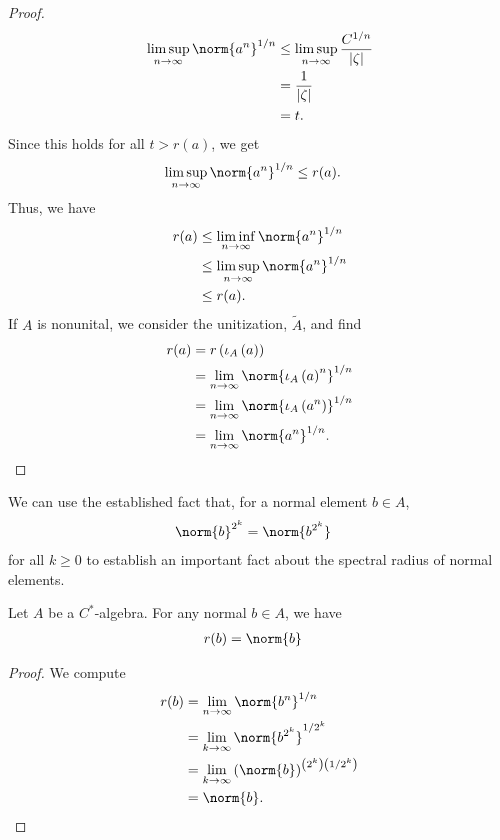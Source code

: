 \documentclass[10pt]{mypackage}
\begin{document}
\begin{proof}
\begin{align*}
    \limsup_{n\rightarrow\infty}\norm{a^n}^{1/n} &\leq \limsup_{n\rightarrow\infty}\frac{C^{1/n}}{\left\vert \zeta \right\vert}\\
                                                 &= \frac{1}{\left\vert \zeta \right\vert}\\
                                                 &= t.
  \end{align*}
  Since this holds for all $t > r(a)$, we get
  \begin{align*}
    \limsup_{n\rightarrow\infty}\norm{a^n}^{1/n} &\leq r(a).
  \end{align*}
  Thus, we have
  \begin{align*}
    r(a) &\leq \liminf_{n\rightarrow\infty}\norm{a^n}^{1/n}\\
         &\leq \limsup_{n\rightarrow\infty}\norm{a^n}^{1/n}\\
         &\leq r(a).
  \end{align*}
  If $A$ is nonunital, we consider the unitization, $\widetilde{A}$, and find
  \begin{align*}
    r(a) &= r\left(\iota_A\left(a\right)\right)\\
         &= \lim_{n\rightarrow\infty}\norm{\iota_A\left(a\right)^{n}}^{1/n}\\
         &= \lim_{n\rightarrow\infty}\norm{\iota_A\left(a^n\right)}^{1/n}\\
         &= \lim_{n\rightarrow\infty}\norm{a^n}^{1/n}.
  \end{align*}
\end{proof}
We can use the established fact that, for a normal element $b\in A$,
\begin{align*}
  \norm{b}^{2^k} &= \norm{b^{2^k}}
\end{align*}
for all $k\geq 0$ to establish an important fact about the spectral radius of normal elements.
\begin{proposition}
  Let $A$ be a $C^{\ast}$-algebra. For any normal $b\in A$, we have
  \begin{align*}
    r(b) &= \norm{b}
  \end{align*}
\end{proposition}
\begin{proof}
  We compute
  \begin{align*}
    r(b) &= \lim_{n\rightarrow\infty}\norm{b^n}^{1/n}\\
         &= \lim_{k\rightarrow\infty}\norm{b^{2^k}}^{1/2^{k}}\\
         &= \lim_{k\rightarrow\infty}\left(\norm{b}\right)^{\left(2^k\right)\left(1/2^{k}\right)}\\
         &= \norm{b}.
  \end{align*}
\end{proof}
\end{document}
